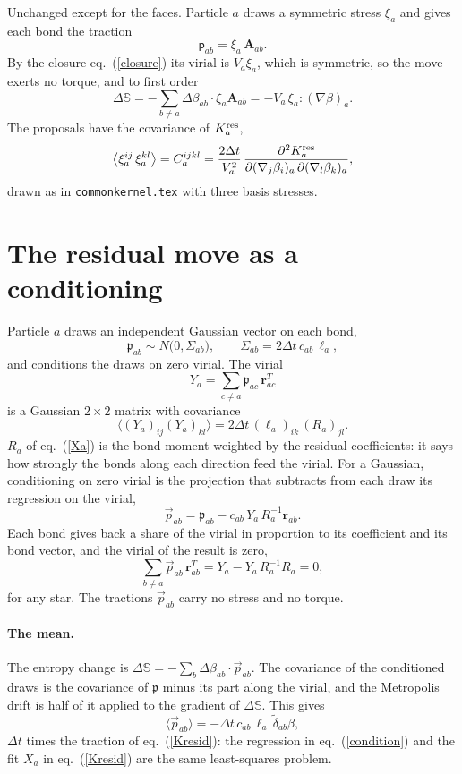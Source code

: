 \documentclass[11pt,aps,preprint,nofootinbib,superscriptaddress,tightenlines]{revtex4-2}
\newcommand{\pf}{\bm{\mathsf p}}
\newcommand{\avg}[1]{\langle #1\rangle}
\def\st{\begin{equation}}
\def\stp{\end{equation}}
\def\Eq#1{eq.~(\ref{#1})}
\let\oldparagraph\paragraph
\renewcommand{\paragraph}{\par\bigskip\oldparagraph}
\begin{document}
Unchanged except for the faces.  Particle $a$ draws a symmetric stress $\xi_a$ and gives each bond the traction
\st
\pf_{ab}=\xi_a\,\bm A_{ab} .
\stp
By the closure \Eq{closure} its virial is $V_a\xi_a$, which is symmetric, so the move exerts no torque, and to first order
\st
\Delta\mathbb S=-\sum_{b\neq a}\Delta\beta_{ab}\cdot\xi_a\bm A_{ab}=-V_a\,\xi_a{:}(\nabla\beta)_a .
\stp
The proposals have the covariance of $K_a^{\rm res}$,
\st
\big\langle\xi_a^{ij}\,\xi_a^{kl}\big\rangle=C_a^{ijkl}=\frac{2\Delta t}{V_a^2}\,
\frac{\partial^2K_a^{\rm res}}{\partial(\nabla_j\beta_i)_a\,\partial(\nabla_l\beta_k)_a} ,
\stp
drawn as in \texttt{commonkernel.tex} with three basis stresses.

\section{The residual move as a conditioning}
\label{sec:resid}

Particle $a$ draws an independent Gaussian vector on each bond,
\st
\mathfrak p_{ab}\sim N\big(0,\Sigma_{ab}\big),\qquad \Sigma_{ab}=2\Delta t\,c_{ab}\,\ell_a ,
\stp
and conditions the draws on zero virial.  The virial
\st
Y_a=\sum_{c\neq a}\mathfrak p_{ac}\,\bm r_{ac}^T
\stp
is a Gaussian $2\times2$ matrix with covariance
\st
\big\langle(Y_a)_{ij}(Y_a)_{kl}\big\rangle=2\Delta t\,(\ell_a)_{ik}\,(R_a)_{jl} .
\stp
$R_a$ of \Eq{Xa} is the bond moment weighted by the residual coefficients: it says how strongly the bonds along each direction feed the
virial.  For a Gaussian, conditioning on zero virial is the projection that subtracts from each draw its regression on the virial,
\st
\vec p_{ab}=\mathfrak p_{ab}-c_{ab}\,Y_a\,R_a^{-1}\bm r_{ab} .
\label{condition}
\stp
Each bond gives back a share of the virial in proportion to its coefficient and its bond vector, and the virial of the result is zero,
\st
\sum_{b\neq a}\vec p_{ab}\,\bm r_{ab}^T=Y_a-Y_a\,R_a^{-1}R_a=0 ,
\stp
for any star.  The tractions $\vec p_{ab}$ carry no stress and no torque.

\paragraph{The mean.}  The entropy change is $\Delta\mathbb S=-\sum_b\Delta\beta_{ab}\cdot\vec p_{ab}$.  The covariance of the conditioned draws is the
covariance of $\mathfrak p$ minus its part along the virial, and the Metropolis drift is half of it applied to the gradient of
$\Delta\mathbb S$.  This gives
\st
\avg{\vec p_{ab}}=-\Delta t\,c_{ab}\,\ell_a\,\tilde\delta_{ab}\beta ,
\stp
$\Delta t$ times the traction of \Eq{Kresid}: the regression in \Eq{condition} and the fit $X_a$ in \Eq{Kresid} are the same least-squares
problem.
\end{document}
